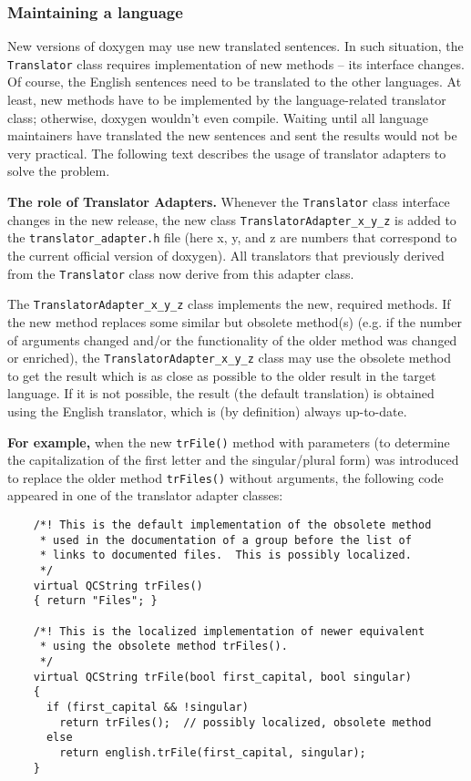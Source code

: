 \subsubsection*{Maintaining a language}

New versions of doxygen may use new translated sentences. In such situation, the {\tt Translator} class requires implementation of new methods -- its interface changes. Of course, the English sentences need to be translated to the other languages. At least, new methods have to be implemented by the language-related translator class; otherwise, doxygen wouldn't even compile. Waiting until all language maintainers have translated the new sentences and sent the results would not be very practical. The following text describes the usage of translator adapters to solve the problem.

{\bf The role of Translator Adapters.} Whenever the {\tt Translator} class interface changes in the new release, the new class {\tt TranslatorAdapter\_\-x\_\-y\_\-z} is added to the {\tt translator\_\-adapter.h} file (here x, y, and z are numbers that correspond to the current official version of doxygen). All translators that previously derived from the {\tt Translator} class now derive from this adapter class.

The {\tt TranslatorAdapter\_\-x\_\-y\_\-z} class implements the new, required methods. If the new method replaces some similar but obsolete method(s) (e.g. if the number of arguments changed and/or the functionality of the older method was changed or enriched), the {\tt TranslatorAdapter\_\-x\_\-y\_\-z} class may use the obsolete method to get the result which is as close as possible to the older result in the target language. If it is not possible, the result (the default translation) is obtained using the English translator, which is (by definition) always up-to-date.

{\bf For example,} when the new {\tt trFile()} method with parameters (to determine the capitalization of the first letter and the singular/plural form) was introduced to replace the older method {\tt trFiles()} without arguments, the following code appeared in one of the translator adapter classes:



\footnotesize\begin{verbatim}
    /*! This is the default implementation of the obsolete method
     * used in the documentation of a group before the list of
     * links to documented files.  This is possibly localized.
     */
    virtual QCString trFiles()
    { return "Files"; }

    /*! This is the localized implementation of newer equivalent
     * using the obsolete method trFiles().
     */
    virtual QCString trFile(bool first_capital, bool singular)
    {
      if (first_capital && !singular)
        return trFiles();  // possibly localized, obsolete method
      else
        return english.trFile(first_capital, singular);
    }
\end{verbatim}
\normalsize


